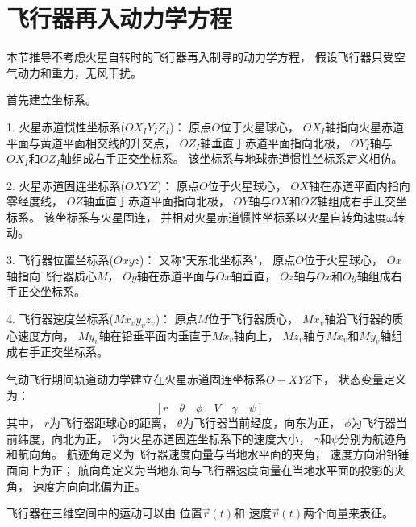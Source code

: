 \section{飞行器再入动力学方程}
本节推导不考虑火星自转时的飞行器再入制导的动力学方程，
假设飞行器只受空气动力和重力，无风干扰。

首先建立坐标系\cite{mdelong2006}。

1. 火星赤道惯性坐标系($OX_IY_IZ_I$)：
原点$O$位于火星球心，
$OX_I$轴指向火星赤道平面与黄道平面相交线的升交点，
$OZ_I$轴垂直于赤道平面指向北极，
$OY_I$轴与$OX_I$和$OZ_I$轴组成右手正交坐标系。
该坐标系与地球赤道惯性坐标系定义相仿。

2. 火星赤道固连坐标系($OXYZ$)：
原点$O$位于火星球心，
$OX$轴在赤道平面内指向零经度线，
$OZ$轴垂直于赤道平面指向北极，
$OY$轴与$OX$和$OZ$轴组成右手正交坐标系。
该坐标系与火星固连，
并相对火星赤道惯性坐标系以火星自转角速度$\omega$转动。

3. 飞行器位置坐标系($Oxyz$)：
又称"天东北坐标系"，
原点$O$位于火星球心，
$Ox$轴指向飞行器质心$M$，
$Oy$轴在赤道平面与$Ox$轴垂直，
$Oz$轴与$Ox$和$Oy$轴组成右手正交坐标系。

4. 飞行器速度坐标系($Mx_vy_vz_v$)：
原点$M$位于飞行器质心，
$Mx_v$轴沿飞行器的质心速度方向，
$My_v$轴在铅垂平面内垂直于$Mx_v$轴向上，
$Mz_v$轴与$Mx_v$和$My_v$轴组成右手正交坐标系。

气动飞行期间轨道动力学建立在火星赤道固连坐标系$O-XYZ$下，
状态变量定义为：
\[[r\quad\theta\quad\phi\quad V\quad\gamma\quad\psi]\]
其中，
$r$为飞行器距球心的距离，
$\theta$为飞行器当前经度，向东为正，
$\phi$为飞行器当前纬度，向北为正，
$V$为火星赤道固连坐标系下的速度大小，
$\gamma$和$\psi$分别为航迹角和航向角。
航迹角定义为飞行器速度向量与当地水平面的夹角，
速度方向沿铅锤面向上为正；
航向角定义为当地东向与飞行器速度向量在当地水平面的投影的夹角，
速度方向向北偏为正。

飞行器在三维空间中的运动可以由
位置$\vec{r}(t)$和
速度$\vec{v}(t)$两个向量来表征。

